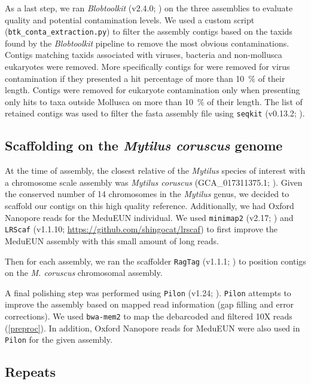 \documentclass[11pt, a4paper]{article}
\begin{document}
As a last step, we ran \textit{Blobtoolkit} (v2.4.0; \cite{Challis2020}) on the three assemblies to evaluate quality and potential contamination levels.
We used a custom script (\texttt{btk\_conta\_extraction.py}) to filter the assembly contigs based on the taxids found by the \textit{Blobtoolkit} pipeline to remove the most obvious contaminations.
Contigs matching taxids associated with viruses, bacteria and non-mollusca eukaryotes were removed.
More specifically contigs for were removed for virus contamination if they presented a hit percentage of more than 10~\% of their length.
Contigs were removed for eukaryote contamination only when presenting only hits to taxa outside Mollusca on more than 10~\% of their length.
The list of retained contigs was used to filter the fasta assembly file using \texttt{seqkit} (v0.13.2; \cite{Shen2016}).


\subsection{Scaffolding on the \textit{Mytilus coruscus} genome}

At the time of assembly, the closest relative of the \textit{Mytilus} species of interest with a chromosome scale assembly was \textit{Mytilus coruscus} (GCA\_017311375.1; \cite{Yang2021}).
Given the conserved number of 14 chromosomes in the \textit{Mytilus} genus, we decided to scaffold our contigs on this high quality reference.
Additionally, we had Oxford Nanopore reads for the MeduEUN individual. 
We used \texttt{minimap2} (v2.17; \cite{Li2017}) and \texttt{LRScaf} (v1.1.10; \url{https://github.com/shingocat/lrscaf}) to first improve the MeduEUN assembly with this small amount of long reads.

Then for each assembly, we ran the scaffolder \texttt{RagTag} (v1.1.1; \cite{Alonge2021}) to position contigs on the \emph{M. coruscus} chromosomal assembly.

A final polishing step was performed using \texttt{Pilon} (v1.24; \cite{Walker2014}).
\texttt{Pilon} attempts to improve the assembly based on mapped read information (gap filling and error corrections).
We used \texttt{bwa-mem2} to map the debarcoded and filtered 10X reads (\cref{preproc}).
In addition, Oxford Nanopore reads for MeduEUN were also used in \texttt{Pilon} for the given assembly.

\subsection{Repeats}
\end{document}
